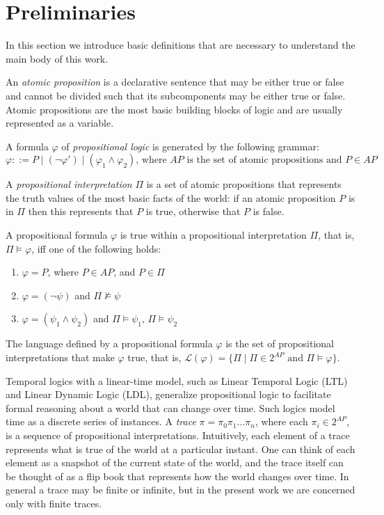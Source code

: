 \documentclass{lmcs}
\theoremstyle{definition}
\DeclareMathOperator{\?}{?}
\begin{document}
\section{Preliminaries}
\label{ch:preliminaries}

In this section we introduce basic definitions that are necessary to understand the main body of this work.

An \textit{atomic proposition} is a declarative sentence that may be either true or false and cannot be divided such that its subcomponents may be either true or false. Atomic propositions are the most basic building blocks of logic and are usually represented as a variable.

A formula $\varphi$ of \textit{propositional logic} is generated by the following grammar:
\[ \varphi::= P \mid (\neg\varphi') \mid (\varphi_1 \wedge \varphi_2)\text{, where $AP$ is the set of atomic propositions and }P \in AP\]

A \textit{propositional interpretation} $\Pi$ is a set of atomic propositions that represents the truth values of
the most basic facts of the world: if an atomic proposition $P$ is in $\Pi$
then this represents that $P$ is true, otherwise that $P$ is false.

A propositional formula $\varphi$ is true within a propositional interpretation $\Pi$, that is, $\Pi \models \varphi$, iff one of the following holds:
\begin{enumerate}
    \item $\varphi = P$, where $P \in AP$, and $P \in \Pi$
    \item $\varphi = (\neg\psi)$ and $\Pi \not\models \psi$
    \item $\varphi = (\psi_1 \wedge \psi_2)$ and $\Pi \models \psi_1$, $\Pi \models \psi_2$
\end{enumerate}

The language defined by a propositional formula $\varphi$ is the set of propositional interpretations that make $\varphi$ true,
that is, $\mathcal{L}(\varphi) = \{ \Pi \mid \Pi \in 2^{AP} \text{ and } \Pi \models \varphi \}$.

Temporal logics with a linear-time model, such as Linear Temporal Logic (LTL) and Linear Dynamic Logic (LDL), generalize
propositional logic to facilitate formal reasoning about a world that can change over time. Such logics model time as a
discrete series of instances. A \textit{trace} $\pi = \pi_0 \pi_1 \ldots \pi_n$, where each $\pi_i \in 2^{AP}$, is a sequence of propositional interpretations. Intuitively, each element
of a trace represents what is true of the world at a particular instant. One can think of each element as a snapshot of the
current state of the world, and the trace itself can be thought of as a flip book that represents how the world changes over time.
In general a trace may be finite or infinite, but in the present work we are concerned only with finite traces.
\end{document}
